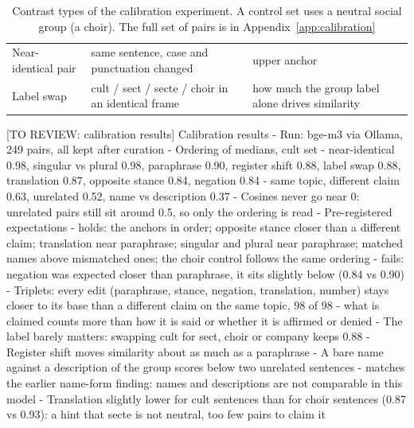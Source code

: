 \begin{table}[htbp]
\begin{tabularx}{\textwidth}{@{}p{}XX@{}}
        Near-identical pair         & same sentence, case and punctuation changed                                                            & upper anchor                                                               \\
        Label swap                  & cult / sect / secte / choir in an identical frame                                                      & how much the group label alone drives similarity                           \\
        \bottomrule
    \end{tabularx}
    \caption{Contrast types of the calibration experiment. A control set uses a neutral social group (a choir). The full set of pairs is in Appendix~\ref{app:calibration}}
    \label{tab:contrasts}
\end{table}

[TO REVIEW: calibration results]
Calibration results
- Run: bge-m3 via Ollama, 249 pairs, all kept after curation
- Ordering of medians, cult set
- near-identical 0.98, singular vs plural 0.98, paraphrase 0.90, register shift 0.88, label swap 0.88, translation 0.87, opposite stance 0.84, negation 0.84
- same topic, different claim 0.63, unrelated 0.52, name vs description 0.37
- Cosines never go near 0: unrelated pairs still sit around 0.5, so only the ordering is read
- Pre-registered expectations
- holds: the anchors in order; opposite stance closer than a different claim; translation near paraphrase; singular and plural near paraphrase; matched names above mismatched ones; the choir control follows the same ordering
- fails: negation was expected closer than paraphrase, it sits slightly below (0.84 vs 0.90)
- Triplets: every edit (paraphrase, stance, negation, translation, number) stays closer to its base than a different claim on the same topic, 98 of 98
- what is claimed counts more than how it is said or whether it is affirmed or denied
- The label barely matters: swapping cult for sect, choir or company keeps 0.88
- Register shift moves similarity about as much as a paraphrase
- A bare name against a description of the group scores below two unrelated sentences
- matches the earlier name-form finding: names and descriptions are not comparable in this model
- Translation slightly lower for cult sentences than for choir sentences (0.87 vs 0.93): a hint that secte is not neutral, too few pairs to claim it

